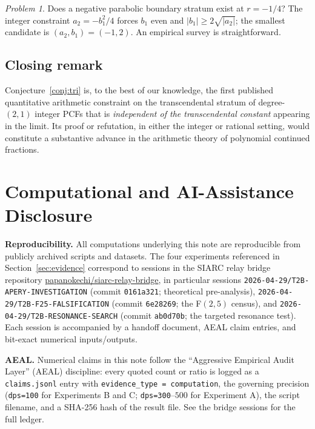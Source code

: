 \documentclass[11pt]{amsart}
\theoremstyle{definition}
\theoremstyle{remark}
\newtheorem{problem}{Problem}
\begin{document}
\begin{problem}\label{prob:negative-parabolic}
Does a negative parabolic boundary stratum exist at $r = -1/4$?
The integer constraint $a_2 = -b_1^2/4$ forces $b_1$ even and
$|b_1| \ge 2\sqrt{|a_2|}$; the smallest candidate is
$(a_2, b_1) = (-1, 2)$.  An empirical survey is straightforward.
\end{problem}

\subsection*{Closing remark}
Conjecture~\ref{conj:tri} is, to the best of our knowledge, the
first published quantitative arithmetic constraint on the
transcendental stratum of degree-$(2,1)$ integer PCFs that is
\emph{independent of the transcendental constant} appearing in the
limit.  Its proof or refutation, in either the integer or rational
setting, would constitute a substantive advance in the
arithmetic theory of polynomial continued fractions.

\section*{Computational and AI-Assistance Disclosure}

\textbf{Reproducibility.}  All computations underlying this note are
reproducible from publicly archived scripts and datasets.  The four
experiments referenced in Section~\ref{sec:evidence} correspond to
sessions in the SIARC relay bridge repository
\href{https://github.com/papanokechi/siarc-relay-bridge}%
{papanokechi/siarc-relay-bridge}, in particular sessions
\texttt{2026-04-29/T2B-APERY-INVESTIGATION} (commit
\texttt{0161a321}; theoretical pre-analysis),
\texttt{2026-04-29/T2B-F25-FALSIFICATION} (commit
\texttt{6e28269}; the F$(2,5)$ census), and
\texttt{2026-04-29/T2B-RESONANCE-SEARCH} (commit
\texttt{ab0d70b}; the targeted resonance test).  Each session is
accompanied by a handoff document, AEAL claim entries, and bit-exact
numerical inputs/outputs.

\textbf{AEAL.}  Numerical claims in this note follow the
``Aggressive Empirical Audit Layer'' (AEAL) discipline: every quoted
count or ratio is logged as a \texttt{claims.jsonl} entry with
\texttt{evidence\_type = computation}, the
governing precision (\texttt{dps=100} for Experiments B and C;
\texttt{dps=300}--$500$ for Experiment A), the script filename,
and a SHA-256 hash of the result file.  See the bridge sessions for
the full ledger.
\end{document}
